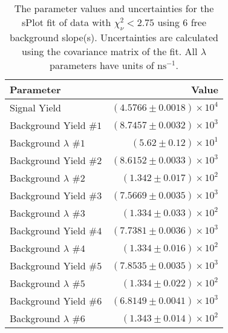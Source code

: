 
\begin{table}
    \begin{center}
        \begin{tabular}{lr}\toprule
            Parameter & Value \\\midrule
            Signal Yield & $(4.5766 \pm 0.0018) \times 10^{4}$ \\
            Background Yield $\#1$ & $(8.7457 \pm 0.0032) \times 10^{3}$ \\
            Background $\lambda$ $\#1$ & $(5.62 \pm 0.12) \times 10^{1}$ \\
            Background Yield $\#2$ & $(8.6152 \pm 0.0033) \times 10^{3}$ \\
            Background $\lambda$ $\#2$ & $(1.342 \pm 0.017) \times 10^{2}$ \\
            Background Yield $\#3$ & $(7.5669 \pm 0.0035) \times 10^{3}$ \\
            Background $\lambda$ $\#3$ & $(1.334 \pm 0.033) \times 10^{2}$ \\
            Background Yield $\#4$ & $(7.7381 \pm 0.0036) \times 10^{3}$ \\
            Background $\lambda$ $\#4$ & $(1.334 \pm 0.016) \times 10^{2}$ \\
            Background Yield $\#5$ & $(7.8535 \pm 0.0035) \times 10^{3}$ \\
            Background $\lambda$ $\#5$ & $(1.334 \pm 0.022) \times 10^{2}$ \\
            Background Yield $\#6$ & $(6.8149 \pm 0.0041) \times 10^{3}$ \\
            Background $\lambda$ $\#6$ & $(1.343 \pm 0.014) \times 10^{2}$ \\\bottomrule
        \end{tabular}
        \caption{The parameter values and uncertainties for the sPlot fit of data with $\chi^2_\nu < 2.75$ using 6 free background slope(s). Uncertainties are calculated using the covariance matrix of the fit. All $\lambda$ parameters have units of $\si{\nano\second}^{-1}$.}
    \end{center}
\end{table}
